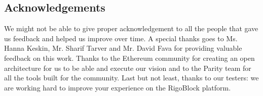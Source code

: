\documentclass[9pt,oneside]{amsart}
\begin{document}
\begin{multicols}{2}
\section{Acknowledgements}
We might not be able to give proper acknowledgement to all the people that gave us feedback and helped us improve over time. A special thanks goes to Ms. Hanna Keskin, Mr. Sharif Tarver and Mr. David Fava for providing valuable feedback on this work. Thanks to the Ethereum community for creating an open architecture for us to be able and execute our vision and to the Parity team for all the tools built for the community. Last but not least, thanks to our testers: we are working hard to improve your experience on the RigoBlock platform.

\end{multicols}
\end{document}
